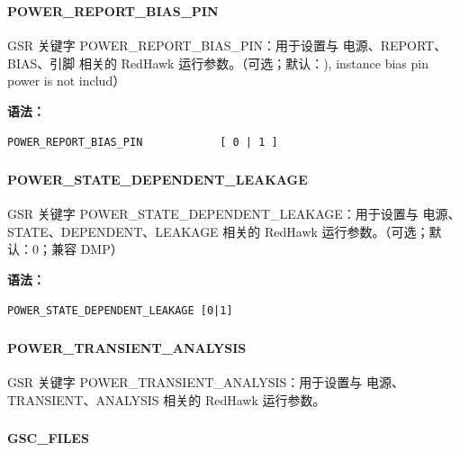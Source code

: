 \subsubsection{}
\paragraph*{POWER_REPORT_BIAS_PIN}

GSR 关键字 POWER_REPORT_BIAS_PIN：用于设置与 电源、REPORT、BIAS、引脚 相关的 RedHawk 运行参数。（可选；默认：), instance bias pin power is not includ）

\textbf{语法：}
\begin{lstlisting}
POWER_REPORT_BIAS_PIN            [ 0 | 1 ]
\end{lstlisting}

\subsubsection{}
\paragraph*{POWER_STATE_DEPENDENT_LEAKAGE}

GSR 关键字 POWER_STATE_DEPENDENT_LEAKAGE：用于设置与 电源、STATE、DEPENDENT、LEAKAGE 相关的 RedHawk 运行参数。（可选；默认：0；兼容 DMP）

\textbf{语法：}
\begin{lstlisting}
POWER_STATE_DEPENDENT_LEAKAGE [0|1]
\end{lstlisting}

\subsubsection{}
\paragraph*{POWER_TRANSIENT_ANALYSIS}

GSR 关键字 POWER_TRANSIENT_ANALYSIS：用于设置与 电源、TRANSIENT、ANALYSIS 相关的 RedHawk 运行参数。

\subsubsection{}
\paragraph*{GSC_FILES}

